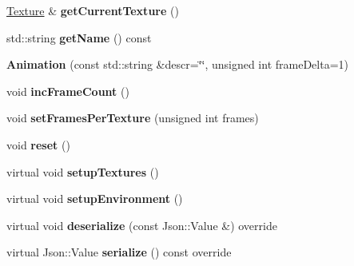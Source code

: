 \begin{DoxyCompactItemize}
\item 
\mbox{\label{classbkengine_1_1Animation_a89e013f462bfe414f152e256ea810ca8}} 
\hyperlink{classbkengine_1_1Texture}{Texture} \& {\bfseries get\+Current\+Texture} ()
\item 
\mbox{\label{classbkengine_1_1Animation_a88b2acdb20e401e8552556564c12616b}} 
std\+::string {\bfseries get\+Name} () const
\item 
\mbox{\label{classbkengine_1_1Animation_a822b375e03043c1e4304b052caadac2f}} 
{\bfseries Animation} (const std\+::string \&descr=\char`\"{}\char`\"{}, unsigned int frame\+Delta=1)
\item 
\mbox{\label{classbkengine_1_1Animation_a512e289acbec4df552208d155412e4e1}} 
void {\bfseries inc\+Frame\+Count} ()
\item 
\mbox{\label{classbkengine_1_1Animation_ae70c8cb0878bf32a2486b69d34ee0fa7}} 
void {\bfseries set\+Frames\+Per\+Texture} (unsigned int frames)
\item 
\mbox{\label{classbkengine_1_1Animation_a903eb4b61b8c7bc72bbedbdba4cbb501}} 
void {\bfseries reset} ()
\item 
\mbox{\label{classbkengine_1_1Animation_ac55679938c88e9477e298973bcb43022}} 
virtual void {\bfseries setup\+Textures} ()
\item 
\mbox{\label{classbkengine_1_1Animation_a06d0f816e562efcc53a52db8463a683a}} 
virtual void {\bfseries setup\+Environment} ()
\item 
\mbox{\label{classbkengine_1_1Animation_a53f49f65aad3c3c442a8212862400c84}} 
virtual void {\bfseries deserialize} (const Json\+::\+Value \&) override
\item 
\mbox{\label{classbkengine_1_1Animation_a089b67a89dbf3529cbcc48a7ea84dd85}} 
virtual Json\+::\+Value {\bfseries serialize} () const override
\item 

\end{DoxyCompactItemize}
